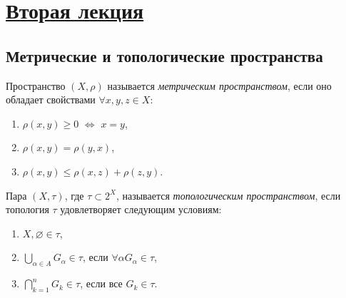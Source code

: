 \section{\href{https://youtu.be/r2DT_f552TA}{Вторая лекция}}

\subsection{Метрические и топологические пространства}

\begin{definition}
  Пространство $(X, \rho)$ называется \emph{метрическим пространством}, если оно обладает свойствами $\forall x,y,z \in X$:
  \begin{enumerate}
    \item $\rho(x, y)\geqslant 0$ $\Leftrightarrow$ $x = y$,
    \item $\rho(x, y) = \rho(y, x)$,
    \item $\rho(x, y) \leqslant \rho(x, z) + \rho(z, y)$.
  \end{enumerate}
\end{definition} 



\begin{definition}
  Пара $(X, \tau)$, где $\tau \subset 2^X$, называется \emph{топологическим пространством}, если топология $\tau$ удовлетворяет следующим условиям:
  \begin{enumerate}
    \item $X, \varnothing \in \tau$,
    \item $\bigcup\limits_{\alpha \in A} G_\alpha \in \tau$, если $\forall \alpha G_\alpha \in \tau$,
    \item $\bigcap\limits_{k=1}^{n} G_k \in \tau$, если все  $G_k \in \tau$.
  \end{enumerate}
\end{definition}

